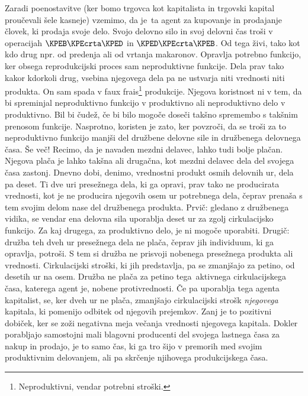\documentclass[kapital_02.tex]{subfiles}
\begin{document}
\renewcommand*{\thefootnote}{\fnsymbol{footnote}}
\setcounter{footnote}{0}
Zaradi poenostavitve (ker bomo trgovca kot kapitalista in trgovski kapital proučevali šele kasneje) vzemimo, da je\KPEstran\ ta agent za kupovanje in prodajanje človek, ki prodaja svoje delo.
Svojo delovno silo in svoj delovni čas troši v operacijah \(\KPEB\KPEcrta\KPED\) in \(\KPED\KPEcrta\KPEB\).
Od tega živi, tako kot kdo drug npr. od predenja ali od vrtanja makaronov.
Opravlja potrebno funkcijo, ker obsega reprodukcijski proces sam neproduktivne funkcije.
Dela prav tako kakor kdorkoli drug, vsebina njegovega dela pa ne ustvarja niti vrednosti niti produkta.
On sam spada v faux frais\footnote{Neproduktivni, vendar potrebni stroški.}
produkcije.
Njegova koristnost ni v tem, da bi spreminjal neproduktivno funkcijo v produktivno ali neproduktivno delo v produktivno.
Bil bi čudež, če bi bilo mogoče doseči takšno spremembo s takšnim prenosom funkcije.
Nasprotno, koristen je zato, ker povzroči, da se troši za to neproduktivno funkcijo manjši del družbene delovne sile in družbenega delovnega časa.
Še več!
Recimo, da je navaden mezdni delavec, lahko tudi bolje plačan.
Njegova plača je lahko takšna ali drugačna, kot mezdni delavec dela del svojega časa zastonj.
Dnevno dobi, denimo, vrednostni produkt osmih delovnih ur, dela pa deset.
Ti dve uri presežnega dela, ki ga opravi, prav tako ne producirata vrednosti, kot je ne producira njegovih osem ur potrebnega dela, čeprav prenaša s tem svojim delom nase del družbenega produkta.
Prvič: gledano z družbenega vidika, se vendar ena delovna sila uporablja deset ur za zgolj cirkulacijsko funkcijo.
Za kaj drugega, za produktivno delo, je ni mogoče uporabiti. Drugič: družba teh dveh ur presežnega dela ne plača, čeprav jih individuum, ki ga opravlja, potroši.
S tem si družba ne prisvoji nobenega presežnega produkta ali vrednosti.
Cirkulacijski stroški, ki jih predstavlja, pa se zmanjšajo za petino, od desetih ur na osem.
Družba ne plača za petino tega\KPEstran\ aktivnega cirkulacijskega časa, katerega agent je, nobene protivrednosti. Če pa uporablja tega agenta kapitalist, se, ker dveh ur ne plača, zmanjšajo cirkulacijski strošk \emph{njegovega} kapitala, ki pomenijo odbitek od njegovih prejemkov.
Zanj je to pozitivni dobiček, ker se zoži negativna meja večanja vrednosti njegovega kapitala.
Dokler porabljajo samostojni mali blagovni producenti del svojega lastnega časa za nakup in prodajo, je to samo čas, ki ga tro šijo v premorih med svojim produktivnim delovanjem, ali pa skrčenje njihovega produkcijskega časa.
\renewcommand*{\thefootnote}{\arabic{footnote}}
\setcounter{footnote}{11}
\end{document}

